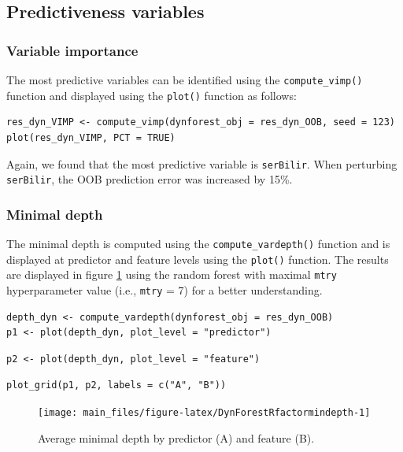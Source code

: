 \subsection{Predictiveness variables}\label{predictiveness-variables}

\subsubsection{Variable importance}\label{variable-importance-2}

The most predictive variables can be identified using the \texttt{compute\_vimp()} function and displayed using the \texttt{plot()} function as follows:

\begin{verbatim}
res_dyn_VIMP <- compute_vimp(dynforest_obj = res_dyn_OOB, seed = 123)
plot(res_dyn_VIMP, PCT = TRUE)
\end{verbatim}

Again, we found that the most predictive variable is \texttt{serBilir}. When perturbing \texttt{serBilir}, the OOB prediction error was increased by 15\%.

\subsubsection{Minimal depth}\label{minimal-depth-2}

The minimal depth is computed using the \texttt{compute\_vardepth()} function and is displayed at predictor and feature levels using the \texttt{plot()} function. The results are displayed in figure \ref{fig:DynForestRfactormindepth} using the random forest with maximal \texttt{mtry} hyperparameter value (i.e., \texttt{mtry} = 7) for a better understanding.

\begin{verbatim}
depth_dyn <- compute_vardepth(dynforest_obj = res_dyn_OOB)
p1 <- plot(depth_dyn, plot_level = "predictor")
\end{verbatim}

\begin{verbatim}
p2 <- plot(depth_dyn, plot_level = "feature")
\end{verbatim}

\begin{verbatim}
plot_grid(p1, p2, labels = c("A", "B"))
\end{verbatim}

\begin{figure}

{\centering \texttt{[image: main\_files/figure-latex/DynForestRfactormindepth-1]}

}

\caption{Average minimal depth by predictor (A) and feature (B).}\label{fig:DynForestRfactormindepth}
\end{figure}

